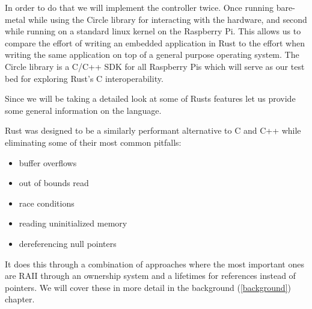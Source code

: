 In order to do that we will implement the controller twice.
Once running bare-metal while using the Circle library for interacting with the hardware,
and second while running on a standard linux kernel on the Raspberry Pi.
This allows us to compare the effort of writing an embedded application in Rust to the effort
when writing the same application on top of a general purpose operating system.
The Circle library is a C/C++ SDK for all Raspberry Pis which will serve as our test bed for exploring Rust's C interoperability.

Since we will be taking a detailed look at some of Rusts features let us provide some general information on the language.

Rust was designed to be a similarly performant alternative to C and C++ while eliminating some of their most common pitfalls:\\
\begin{itemize}
    \item buffer overflows
    \item out of bounds read
    \item race conditions
    \item reading uninitialized memory
    \item dereferencing null pointers
\end{itemize}

It does this through a combination of approaches where the most important ones are RAII through an ownership system and a lifetimes for references instead of pointers.
We will cover these in more detail in the background (\ref{background}) chapter.